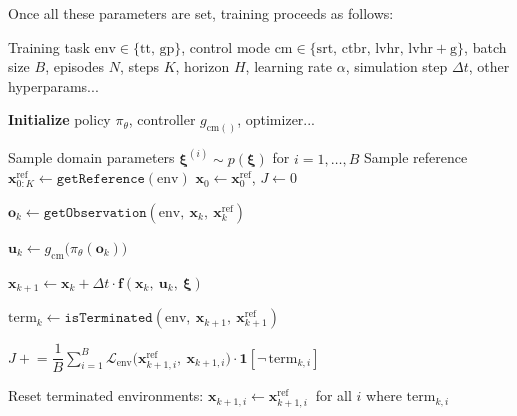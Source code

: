 \newpage
Once all these parameters are set, training proceeds as follows:

\begin{algorithm}[H]
\caption{Training procedure for differentiable policy optimization.}
\label{alg:training}
\begin{algorithmic}[1]
\algrenewcommand{}

\Require Training task $\mathrm{env} \in \{\mathrm{tt},\, \mathrm{gp}\}$,
         control mode $\mathrm{cm} \in \{\mathrm{srt},\, \mathrm{ctbr},\, \mathrm{lvhr},\, \mathrm{lvhr{+}g}\}$,
         batch size $B$, episodes $N$, steps $K$, horizon $H$,
         learning rate $\alpha$, simulation step $\Delta t $, other hyperparams...

\State \textbf{Initialize} policy $\pi_\theta$, controller $g_{\mathrm{cm}()}$, optimizer...

    \State Sample domain parameters $\boldsymbol{\xi}^{(i)} \sim p(\boldsymbol{\xi})$ for $i = 1, \dots, B$ 
    \State Sample reference $\mathbf{x}_{0:K}^{\mathrm{ref}} \gets \texttt{getReference}(\mathrm{env})$ 
    \State $\mathbf{x}_0 \gets \mathbf{x}_0^{\mathrm{ref}}$, \quad $J \gets 0$


        \State $\mathbf{o}_k \gets \texttt{getObservation}(\mathrm{env},\ \mathbf{x}_k,\ \mathbf{x}_k^{\mathrm{ref}})$ 

        \State $\mathbf{u}_k \gets g_{\mathrm{cm}}\!\bigl(\pi_\theta(\mathbf{o}_k)\bigr)$ 

        \State $\mathbf{x}_{k+1} \gets \mathbf{x}_k + \Delta t \cdot \mathbf{f}(\mathbf{x}_k,\ \mathbf{u}_k,\ \boldsymbol{\xi})$ 

        \State $\mathrm{term}_k \gets \texttt{isTerminated}(\mathrm{env},\ \mathbf{x}_{k+1},\ \mathbf{x}_{k+1}^{\mathrm{ref}})$ 

        \State $J \mathrel{+}= \dfrac{1}{B}\displaystyle\sum_{i=1}^{B} \mathcal{L}_{\mathrm{env}}\!\bigl(\mathbf{x}_{k+1,i}^{\mathrm{ref}},\ \mathbf{x}_{k+1,i}\bigr)\cdot\mathbf{1}\!\left[\lnot\,\mathrm{term}_{k,i}\right]$ 

        \State Reset terminated environments: $\mathbf{x}_{k+1,i} \gets \mathbf{x}_{k+1,i}^{\mathrm{ref}}\ $ for all $i$ where $\mathrm{term}_{k,i}$


\end{algorithmic}
\end{algorithm}
